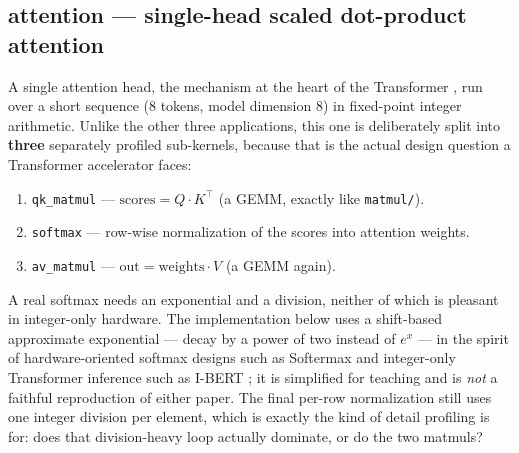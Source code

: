 \documentclass[11pt]{article}
\newcommand{\code}[1]{\texttt{#1}}
\begin{document}
\subsection{attention --- single-head scaled dot-product attention}

A single attention head, the mechanism at the heart of the Transformer
\cite{vaswani2017attention}, run over a short sequence ($8$ tokens, model
dimension $8$) in fixed-point integer arithmetic. Unlike the other three
applications, this one is deliberately split into \textbf{three} separately
profiled sub-kernels, because that is the actual design question a
Transformer accelerator faces:

\begin{enumerate}[nosep]
  \item \code{qk\_matmul} --- $\mathrm{scores} = Q \cdot K^\top$ (a GEMM,
        exactly like \code{matmul/}).
  \item \code{softmax} --- row-wise normalization of the scores into
        attention weights.
  \item \code{av\_matmul} --- $\mathrm{out} = \mathrm{weights} \cdot V$
        (a GEMM again).
\end{enumerate}

A real softmax needs an exponential and a division, neither of which is
pleasant in integer-only hardware. The implementation below uses a
shift-based approximate exponential --- decay by a power of two instead of
$e^x$ --- in the spirit of hardware-oriented softmax designs such as
Softermax \cite{stevens2021softermax} and integer-only Transformer inference
such as I-BERT \cite{kim2021ibert}; it is simplified for teaching and is
\emph{not} a faithful reproduction of either paper. The final per-row
normalization still uses one integer division per element, which is exactly
the kind of detail profiling is for: does that division-heavy loop actually
dominate, or do the two matmuls?
\end{document}
